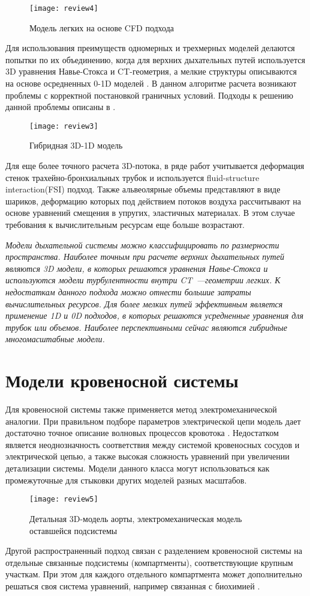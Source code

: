 \begin{figure}[!ht]
	\centering
	\texttt{[image: review4]}
	\caption{Модель легких на основе CFD подхода } 
\end{figure}
Для использования преимуществ одномерных и трехмерных моделей делаются попытки по их объединению, когда для верхних дыхательных путей используется 3D уравнения Навье-Стокса и CT-геометрия, а мелкие структуры описываются на основе осредненных 0-1D моделей \cite{Lin2009,Ma2006,Comerford2010,Yoshihara2013,Yin2010}. В данном алгоритме расчета возникают проблемы с корректной постановкой граничных условий. Подходы к решению данной проблемы описаны в \cite{Lin2009,Ma2006,Comerford2010,Yin2010,Quarteroni2003,Formaggia2000,Fernandez2005}.
\begin{figure}[!ht]
	\centering
	\texttt{[image: review3]}
	\caption{Гибридная 3D-1D модель } 
\end{figure}
Для еще более точного расчета 3D-потока, в ряде работ учитывается деформация стенок трахейно-бронхиальных трубок и используется fluid-structure interaction(FSI) подход. Также альвеолярные объемы представляют в виде шариков, деформацию которых под действием потоков воздуха рассчитывают на основе уравнений смещения в упругих, эластичных материалах.  В этом случае требования к вычислительным ресурсам еще больше возрастают.

\textit{Модели дыхательной системы можно классифицировать по размерности пространства. Наиболее точным при расчете верхних дыхательных путей являются 3D модели, в которых решаются уравнения Навье-Стокса и используются модели турбулентности внутри CT~---геометрии легких. К недостаткам данного подхода можно отнести большие затраты вычислительных ресурсов. Для более мелких путей эффективным является применение 1D и 0D подходов, в которых решаются усредненные уравнения для трубок или объемов. Наиболее перспективными сейчас являются гибридные многомасштабные модели. }

\section{Модели кровеносной системы}

Для кровеносной системы также применяется метод электромеханической аналогии. При правильном подборе параметров электрической цепи модель
дает достаточно точное описание волновых процессов кровотока \cite{Hassani2006,Mynard2012}. Недостатком
является неоднозначность соответствия между системой кровеносных сосудов
и электрической цепью, а также высокая сложность уравнений при увеличении
детализации системы. Модели данного класса могут использоваться как промежуточные для стыковки других моделей разных масштабов.   
\begin{figure}[!ht]
	\centering
	\texttt{[image: review5]}
	\caption{Детальная 3D-модель аорты, электромеханическая модель оставшейся подсистемы} 
\end{figure}
Другой распространенный подход связан с разделением кровеносной системы на отдельные связанные подсистемы (компартменты), соответствующие крупным участкам. При этом для каждого отдельного компартмента может дополнительно решаться своя система уравнений, например связанная с биохимией \cite{Blanco2016}.  

